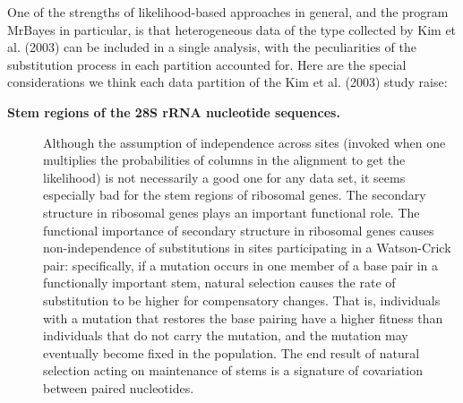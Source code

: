 \documentclass{svmult}
\begin{document}
One of the strengths of likelihood-based approaches in general, and the program MrBayes in particular, is that
heterogeneous data of the type collected by Kim et al. (2003) can be included in a single analysis, with the peculiarities of the substitution process in each partition
accounted for. Here are the special considerations we think each data partition of the Kim et al. (2003) study raise:
\begin{description}
\item[ {\bf Stem regions of the 28S rRNA nucleotide sequences.}] Although the assumption of independence across sites (invoked when one multiplies the probabilities
of columns in the alignment to get the likelihood) is not necessarily a good one for any data set, it seems especially bad for the stem regions of ribosomal genes. 
The secondary structure in ribosomal genes plays an important functional role. The functional importance of secondary structure in ribosomal genes causes non-independence
of substitutions in sites participating in a Watson-Crick pair: specifically,  if a mutation occurs in one
member of a base pair in a functionally important stem, natural selection causes the rate of
substitution to be higher for compensatory changes. That is, individuals with
a mutation that restores the base pairing have a higher fitness than individuals
that do not carry the mutation, and the mutation may eventually become
fixed in the population. The end result of natural selection
acting on maintenance of stems is a signature of covariation between paired nucleotides.\\


\end{description}
\end{document}
